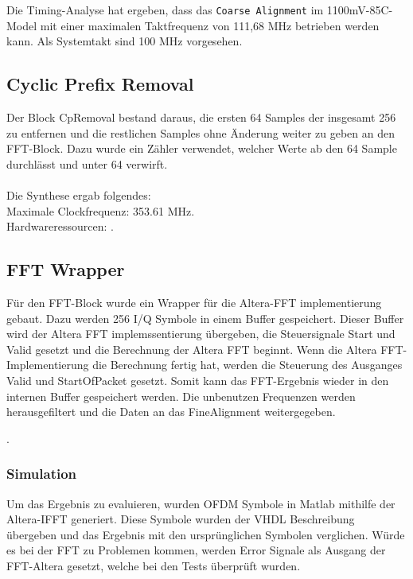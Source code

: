 Die Timing-Analyse hat ergeben, dass das \texttt{Coarse Alignment} im 1100mV-85C-Model mit einer maximalen Taktfrequenz von 111,68 MHz betrieben werden kann. Als Systemtakt sind 100 MHz vorgesehen.

\subsection{Cyclic Prefix Removal}
Der Block CpRemoval bestand daraus, die ersten 64 Samples der insgesamt 256 zu entfernen und die restlichen Samples ohne Änderung weiter zu geben an den FFT-Block. Dazu wurde ein Zähler verwendet, welcher Werte ab den 64 Sample durchlässt und unter 64 verwirft.\\
\\
Die Synthese ergab folgendes:\\
Maximale Clockfrequenz: 353.61 MHz.\\
Hardwareressourcen:
.


\subsection{FFT Wrapper}
Für den FFT-Block  wurde ein Wrapper für die Altera-FFT implementierung gebaut. Dazu werden 256 I/Q Symbole in einem Buffer gespeichert. Dieser Buffer wird der Altera FFT implemssentierung übergeben, die Steuersignale Start und Valid gesetzt und die Berechnung der Altera FFT beginnt. Wenn die Altera FFT-Implementierung die Berechnung fertig hat, werden die Steuerung des Ausganges Valid und StartOfPacket gesetzt. Somit kann das FFT-Ergebnis wieder in den internen Buffer gespeichert werden. Die unbenutzen Frequenzen werden herausgefiltert und die Daten an das FineAlignment weitergegeben.

.

\subsubsection{Simulation}
Um das Ergebnis zu evaluieren, wurden OFDM Symbole in Matlab mithilfe der Altera-IFFT generiert. Diese Symbole wurden der VHDL Beschreibung übergeben und das Ergebnis mit den ursprünglichen Symbolen verglichen. Würde es bei der FFT zu Problemen kommen, werden Error Signale als Ausgang der FFT-Altera gesetzt, welche bei den Tests überprüft wurden.

